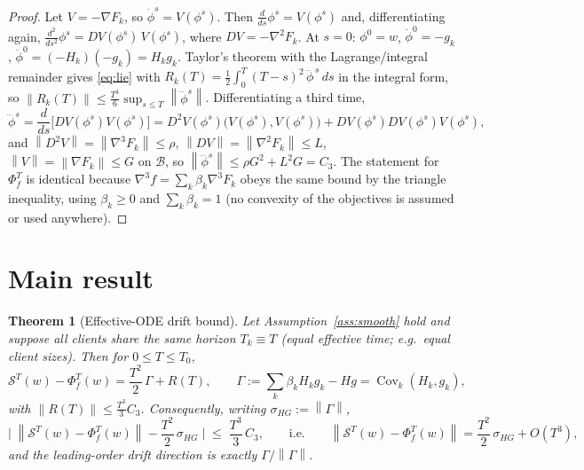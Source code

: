 \documentclass[11pt]{article}
\newtheorem{theorem}{Theorem}
\theoremstyle{definition}
\newcommand{\norm}[1]{\left\lVert#1\right\rVert}
\newcommand{\grad}{\nabla}
\newcommand{\Cov}{\operatorname{Cov}}
\begin{document}
\begin{proof}
Let $V=-\grad F_k$, so $\dot\phi^s=V(\phi^s)$. Then
$\tfrac{d}{ds}\phi^s=V(\phi^s)$ and, differentiating again,
$\tfrac{d^2}{ds^2}\phi^s=DV(\phi^s)\,V(\phi^s)$, where $DV=-\grad^2F_k$. At $s=0$:
$\phi^0=w$, $\dot\phi^0=-g_k$, $\ddot\phi^0=(-H_k)(-g_k)=H_kg_k$. Taylor's
theorem with the Lagrange/integral remainder gives \eqref{eq:lie} with
$R_k(T)=\tfrac12\int_0^T (T-s)^2\,\dddot\phi^{\,s}\,ds$ in the integral form, so
$\norm{R_k(T)}\le \tfrac{T^3}{6}\sup_{s\le T}\norm{\dddot\phi^s}$. Differentiating
a third time,
\[
\dddot\phi^s=\frac{d}{ds}\big[DV(\phi^s)V(\phi^s)\big]
=D^2V(\phi^s)\big(V(\phi^s),V(\phi^s)\big)+DV(\phi^s)DV(\phi^s)V(\phi^s),
\]
and $\norm{D^2V}=\norm{\grad^3F_k}\le\rho$, $\norm{DV}=\norm{\grad^2F_k}\le L$,
$\norm{V}=\norm{\grad F_k}\le G$ on $\mathcal B$, so
$\norm{\dddot\phi^s}\le \rho G^2+L^2G=C_3$. The statement for $\Phi_f^T$ is
identical because $\grad^3 f=\sum_k\beta_k\grad^3F_k$ obeys the same bound by
the triangle inequality, using $\beta_k\ge0$ and $\sum_k\beta_k=1$ (no convexity
of the objectives is assumed or used anywhere).
\end{proof}

\section{Main result}

\begin{theorem}[Effective-ODE drift bound]\label{thm:main}
Let Assumption~\ref{ass:smooth} hold and suppose all clients share the same
horizon $T_k\equiv T$ (equal effective time; e.g.\ equal client sizes). Then for
$0\le T\le T_0$,
\begin{equation}
\mathcal S^{T}(w)-\Phi_f^{T}(w)=\frac{T^2}{2}\,\Gamma+R(T),
\qquad
\Gamma:=\sum_k\beta_k H_k g_k-Hg=\Cov_k(H_k,g_k),
\label{eq:thm}
\end{equation}
with $\norm{R(T)}\le \tfrac{T^3}{3}C_3$. Consequently, writing
$\sigma_{HG}:=\norm{\Gamma}$,
\begin{equation}
\Big|\;\norm{\mathcal S^{T}(w)-\Phi_f^{T}(w)}-\frac{T^2}{2}\,\sigma_{HG}\;\Big|
\;\le\;\frac{T^3}{3}\,C_3,
\qquad\text{i.e.}\qquad
\norm{\mathcal S^{T}(w)-\Phi_f^{T}(w)}=\frac{T^2}{2}\,\sigma_{HG}+O(T^3),
\label{eq:thm2}
\end{equation}
and the leading-order drift direction is exactly $\Gamma/\norm{\Gamma}$.
\end{theorem}
\end{document}
